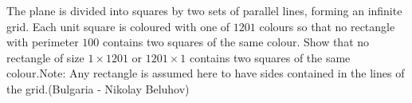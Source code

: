 The plane is divided into squares by two sets of parallel lines, forming an infinite grid. Each unit square is coloured with one of $1201$ colours so that no rectangle with perimeter $100$ contains two squares of the same colour. Show that no rectangle of size $1\times1201$ or $1201\times1$ contains two squares of the same colour.Note: Any rectangle is assumed here to have sides contained in the lines of the grid.(Bulgaria - Nikolay Beluhov)
